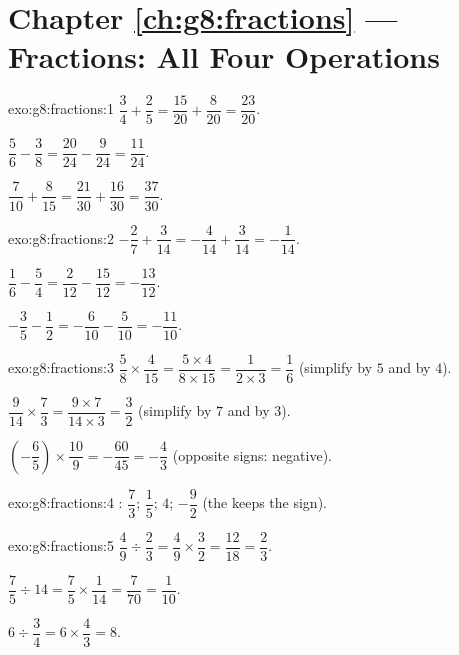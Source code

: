 \section*{Chapter \ref{ch:g8:fractions} --- Fractions: All Four Operations}

\begin{solution}{exo:g8:fractions:1}
$\dfrac34 + \dfrac25 = \dfrac{15}{20} + \dfrac{8}{20} =
\dfrac{23}{20}$.

$\dfrac56 - \dfrac38 = \dfrac{20}{24} - \dfrac{9}{24} =
\dfrac{11}{24}$.

$\dfrac{7}{10} + \dfrac{8}{15} = \dfrac{21}{30} + \dfrac{16}{30} =
\dfrac{37}{30}$.
\end{solution}

\begin{solution}{exo:g8:fractions:2}
$-\dfrac27 + \dfrac{3}{14} = -\dfrac{4}{14} + \dfrac{3}{14} =
-\dfrac{1}{14}$.

$\dfrac16 - \dfrac54 = \dfrac{2}{12} - \dfrac{15}{12} =
-\dfrac{13}{12}$.

$-\dfrac35 - \dfrac12 = -\dfrac{6}{10} - \dfrac{5}{10} =
-\dfrac{11}{10}$.
\end{solution}

\begin{solution}{exo:g8:fractions:3}
$\dfrac58 \times \dfrac{4}{15} = \dfrac{5 \times 4}{8 \times 15}
= \dfrac{1}{2 \times 3} = \dfrac16$ (simplify by $5$ and by $4$).

$\dfrac{9}{14} \times \dfrac73 = \dfrac{9 \times 7}{14 \times 3}
= \dfrac{3}{2}$ (simplify by $7$ and by $3$).

$\left(-\dfrac65\right) \times \dfrac{10}{9} = -\dfrac{60}{45}
= -\dfrac43$ (opposite signs: negative).
\end{solution}

\begin{solution}{exo:g8:fractions:4}
: $\dfrac73$; \quad $\dfrac15$; \quad $4$; \quad
$-\dfrac92$ (the  keeps the sign).
\end{solution}

\begin{solution}{exo:g8:fractions:5}
$\dfrac49 \div \dfrac23 = \dfrac49 \times \dfrac32 = \dfrac{12}{18}
= \dfrac23$.

$\dfrac75 \div 14 = \dfrac75 \times \dfrac{1}{14} = \dfrac{7}{70}
= \dfrac{1}{10}$.

$6 \div \dfrac34 = 6 \times \dfrac43 = 8$.
\end{solution}


